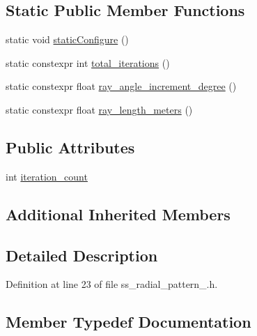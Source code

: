 \subsection*{Static Public Member Functions}
\begin{DoxyCompactItemize}
\item 
static void \hyperlink{structsm__dance__bot__3_1_1SS3_1_1SsRadialPattern3_afecfec1c1156ee6dbc119c716a175c8c}{static\+Configure} ()
\item 
static constexpr int \hyperlink{structsm__dance__bot__3_1_1SS3_1_1SsRadialPattern3_af8111cc704f110ae11cededfa1b01192}{total\+\_\+iterations} ()
\item 
static constexpr float \hyperlink{structsm__dance__bot__3_1_1SS3_1_1SsRadialPattern3_ae3236f8f013b0467538598ab312c480b}{ray\+\_\+angle\+\_\+increment\+\_\+degree} ()
\item 
static constexpr float \hyperlink{structsm__dance__bot__3_1_1SS3_1_1SsRadialPattern3_ada7c98fca3b1af45dab6deab35d700ed}{ray\+\_\+length\+\_\+meters} ()
\end{DoxyCompactItemize}
\subsection*{Public Attributes}
\begin{DoxyCompactItemize}
\item 
int \hyperlink{structsm__dance__bot__3_1_1SS3_1_1SsRadialPattern3_a83ff2f4fce867bf0cfb53ec61fc37212}{iteration\+\_\+count}
\end{DoxyCompactItemize}
\subsection*{Additional Inherited Members}


\subsection{Detailed Description}


Definition at line 23 of file ss\+\_\+radial\+\_\+pattern\+\_.\+h.



\subsection{Member Typedef Documentation}
